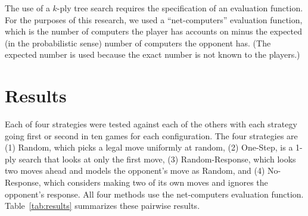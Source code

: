 \documentclass{sig-alternate}
\begin{document}
The use of a $k$-ply tree search requires the specification of an evaluation function. For the purposes of this research, we used a ``net-computers'' evaluation function, which is the number of computers the player has accounts on minus the expected (in the probabilistic sense) number of computers the opponent has. (The expected number is used because the exact number is not known to the players.) 

% 

\section{Results}
\label{sec:results}




Each of four strategies were tested against each of the others with each strategy going first or second in ten games for each configuration.
The four strategies are (1) Random, which picks a legal move uniformly at random, (2) One-Step, is a 1-ply search that looks at only the first move, 
(3) Random-Response, which looks two moves ahead and models the opponent's move as Random, and 
(4) No-Response, which considers making two of its own moves and ignores the opponent's response.
All four methods use the net-computers evaluation function.
Table~\ref{tab:results} summarizes these pairwise results.
\end{document}
